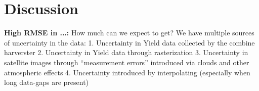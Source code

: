 \chapter{Discussion}


\textbf{High RMSE in ...:} How much can we expect to get? We have multiple sources of uncertainty in the data:
1. Uncertainty in Yield data collected by the combine harverster
2. Uncertainty in Yield data through rasterization
3. Uncertainty in satellite images through ``measurement errors'' introduced via clouds and other atmospheric effects 
4. Uncertainty introduced by interpolating (especially when long data-gaps are present)
